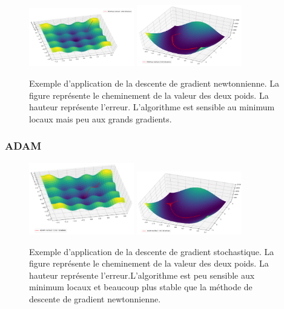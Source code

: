 \begin{figure}[!h]
\centering
\includegraphics[width=130pt]{"images/MLP/RMSProp"}
\hspace*{10mm}
\includegraphics[width=130pt]{"images/MLP/RMSPropPropre"}
\caption{Exemple d'application de la descente de gradient newtonnienne. La figure représente le cheminement de la valeur des deux poids. La hauteur représente l'erreur. L'algorithme est sensible au minimum locaux mais peu aux grands gradients.}
\label{RMSProp}
\end{figure}

\subsubsection{ADAM}


\begin{figure}[!h]
\centering
\includegraphics[width=130pt]{"images/MLP/adam"}
\hspace*{10mm}
\includegraphics[width=130pt]{"images/MLP/adampropre"}
\caption{Exemple d'application de la descente de gradient stochastique. La figure représente le cheminement de la valeur des deux poids. La hauteur représente l'erreur.L'algorithme est peu sensible aux minimum locaux et beaucoup plus stable que la méthode de descente de gradient newtonnienne.}
\label{descentedegradientnewtonnienne}
\end{figure}

